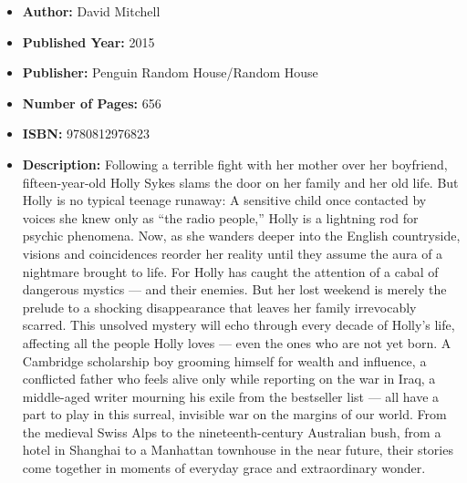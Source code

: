 \documentclass{tufte-handout}
\begin{document}
\begin{itemize}
    \item[] \textbf{Author:} David Mitchell
    \item[] \textbf{Published Year:} 2015  
    \item[] \textbf{Publisher:} Penguin Random House/Random House
    \item[] \textbf{Number of Pages:} 656      
    \item[] \textbf{ISBN:} 9780812976823
    \item[] \textbf{Description:} Following a terrible fight with her mother over her boyfriend, fifteen-year-old Holly Sykes slams the door on her family and her old life. But Holly is no typical teenage runaway: A sensitive child once contacted by voices she knew only as ``the radio people,'' Holly is a lightning rod for psychic phenomena. Now, as she wanders deeper into the English countryside, visions and coincidences reorder her reality until they assume the aura of a nightmare brought to life. For Holly has caught the attention of a cabal of dangerous mystics --- and their enemies. But her lost weekend is merely the prelude to a shocking disappearance that leaves her family irrevocably scarred. This unsolved mystery will echo through every decade of Holly’s life, affecting all the people Holly loves --- even the ones who are not yet born. A Cambridge scholarship boy grooming himself for wealth and influence, a conflicted father who feels alive only while reporting on the war in Iraq, a middle-aged writer mourning his exile from the bestseller list --- all have a part to play in this surreal, invisible war on the margins of our world. From the medieval Swiss Alps to the nineteenth-century Australian bush, from a hotel in Shanghai to a Manhattan townhouse in the near future, their stories come together in moments of everyday grace and extraordinary wonder.
\end{itemize}
\end{document}
